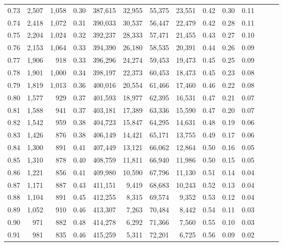 \begin{tabular}{rrrrrrrrrrrrrr}
0.73 &  2,507 &  1,058 &  0.30 &  387,615 &   32,955 &  55,375 &  23,551 &  0.42 &  0.30 &      0.11 \\
0.74 &  2,418 &  1,072 &  0.31 &  390,033 &   30,537 &  56,447 &  22,479 &  0.42 &  0.28 &      0.11 \\
0.75 &  2,204 &  1,024 &  0.32 &  392,237 &   28,333 &  57,471 &  21,455 &  0.43 &  0.27 &      0.10 \\
0.76 &  2,153 &  1,064 &  0.33 &  394,390 &   26,180 &  58,535 &  20,391 &  0.44 &  0.26 &      0.09 \\
0.77 &  1,906 &    918 &  0.33 &  396,296 &   24,274 &  59,453 &  19,473 &  0.45 &  0.25 &      0.09 \\
0.78 &  1,901 &  1,000 &  0.34 &  398,197 &   22,373 &  60,453 &  18,473 &  0.45 &  0.23 &      0.08 \\
0.79 &  1,819 &  1,013 &  0.36 &  400,016 &   20,554 &  61,466 &  17,460 &  0.46 &  0.22 &      0.08 \\
0.80 &  1,577 &    929 &  0.37 &  401,593 &   18,977 &  62,395 &  16,531 &  0.47 &  0.21 &      0.07 \\
0.81 &  1,588 &    941 &  0.37 &  403,181 &   17,389 &  63,336 &  15,590 &  0.47 &  0.20 &      0.07 \\
0.82 &  1,542 &    959 &  0.38 &  404,723 &   15,847 &  64,295 &  14,631 &  0.48 &  0.19 &      0.06 \\
0.83 &  1,426 &    876 &  0.38 &  406,149 &   14,421 &  65,171 &  13,755 &  0.49 &  0.17 &      0.06 \\
0.84 &  1,300 &    891 &  0.41 &  407,449 &   13,121 &  66,062 &  12,864 &  0.50 &  0.16 &      0.05 \\
0.85 &  1,310 &    878 &  0.40 &  408,759 &   11,811 &  66,940 &  11,986 &  0.50 &  0.15 &      0.05 \\
0.86 &  1,221 &    856 &  0.41 &  409,980 &   10,590 &  67,796 &  11,130 &  0.51 &  0.14 &      0.04 \\
0.87 &  1,171 &    887 &  0.43 &  411,151 &    9,419 &  68,683 &  10,243 &  0.52 &  0.13 &      0.04 \\
0.88 &  1,104 &    891 &  0.45 &  412,255 &    8,315 &  69,574 &   9,352 &  0.53 &  0.12 &      0.04 \\
0.89 &  1,052 &    910 &  0.46 &  413,307 &    7,263 &  70,484 &   8,442 &  0.54 &  0.11 &      0.03 \\
0.90 &    971 &    882 &  0.48 &  414,278 &    6,292 &  71,366 &   7,560 &  0.55 &  0.10 &      0.03 \\
0.91 &    981 &    835 &  0.46 &  415,259 &    5,311 &  72,201 &   6,725 &  0.56 &  0.09 &      0.02 \\

\end{tabular}
